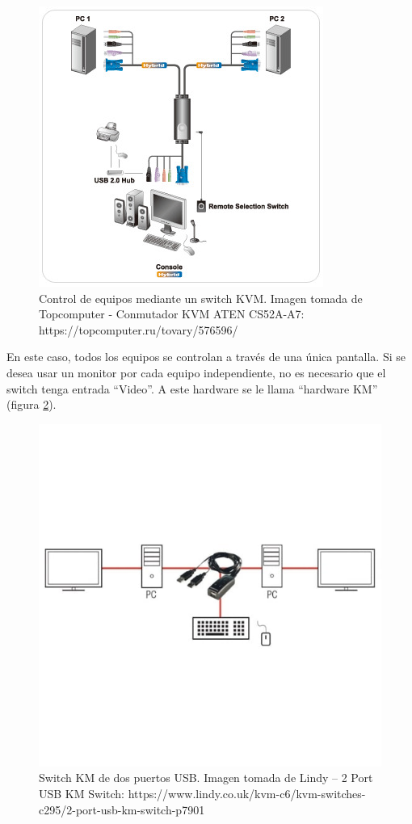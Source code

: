 \begin{figure}[h!]
\centering
\includegraphics[scale = 0.7]{capitulo_01/figuras_dir/KVM.jpg}
\caption{Control de equipos mediante un switch KVM. Imagen tomada de Topcomputer - Conmutador KVM ATEN CS52A-A7: https://topcomputer.ru/tovary/576596/}
\label{fig:switchKVM}
\end{figure}

En este caso, todos los equipos se controlan a través de una única pantalla. Si se desea usar un monitor por cada equipo independiente, no es necesario que el switch tenga entrada ``Video''. A este hardware se le llama ``hardware KM'' (figura \ref{fig:switchKM}).

\begin{figure}
\centering
\includegraphics[scale = 0.5]{capitulo_01/figuras_dir/KMSwitch.jpg}
\caption{Switch KM de dos puertos USB. Imagen tomada de Lindy – 2 Port USB KM Switch: https://www.lindy.co.uk/kvm-c6/kvm-switches-c295/2-port-usb-km-switch-p7901}
\label{fig:switchKM}
\end{figure}

